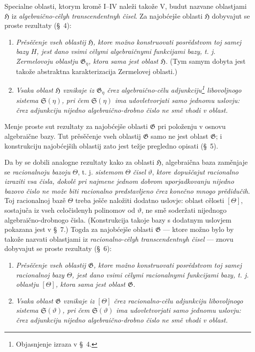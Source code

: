 \documentclass[11pt]{article}
\begin{document}
Specialne oblasti, ktorym kromě I--IV naleži takože V, budut nazvane oblastjami $\mathfrak H$ iz {\itshape algebraično-cělyh transcendentnyh čisel}. Za najobćejše oblasti $\mathfrak H$ dobyvajut se proste rezultaty (\S\ 4):
\begin{enumerate}
\item[a)] {\itshape Prěsěčenje vseh oblastij $\mathfrak H$, ktore možno konstruovati posrědstvom toj samej bazy $H$, jest dano vsimi cělymi algebraičnymi funkcijami bazy, t. j. Zermelovoju oblastju $\mathfrak G_\eta$, ktora sama jest oblast $\mathfrak H$.} (Tym samym dobyta jest takože abstraktna karakterizacija Zermelovej oblasti.)
\item[b)] {\itshape Vsaka oblast $\mathfrak H$ vznikaje iz $\mathfrak G_\eta$ črez algebraično-cělu adjunkciju\footnote{Objasnjenje izraza v \S\ 4.} libovoljnogo sistema $\mathfrak S(\eta)$, pri čem $\mathfrak S(\eta)$ ima udovletvorjati samo jednomu uslovju: črez adjunkciju nijedno algebraično-drobno čislo ne smě vhodi v oblast.}
\end{enumerate}

Menje proste sut rezultaty za najobćejše oblasti $\mathfrak G$ pri položenju v osnovu algebraične bazy. Tut prěsěčenje vseh oblastij $\mathfrak G$ samo ne jest oblast $\mathfrak G$; i konstrukciju najobćejših oblastij zato jest težje pregledno opisati (\S\ 5).

Da by se dobili analogne rezultaty kako za oblasti $\mathfrak H$, algebraična baza zaměnjaje se {\itshape racionalnoju bazoju} $\Theta$, t. j. {\itshape sistemom} $\Theta$ {\itshape čisel} $\vartheta$, {\itshape ktore dopuščajut racionalno izraziti vsa čisla, dokolě pri najmene jednom dobrom uporjadkovanju nijedno bazovo čislo ne može biti racionalno predstavljeno črez konečno mnogo prědidučih}. Toj racionalnoj bazě $\Theta$ treba ješče naložiti dodatno uslovje: oblast cělosti $[\Theta]$, sostajuča iz vseh celočislenyh polinomov od $\vartheta$, ne smě soderžati nijednogo algebraično-drobnogo čisla. (Konstrukcija takoje bazy s dodatnym uslovjem pokazana jest v \S\ 7.) Togda za najobćejše oblasti $\mathfrak G$ --- ktore možno bylo by takože nazvati oblastjami iz {\itshape racionalno-cělyh transcendentnyh čisel} --- znovu dobyvajut se proste rezultaty (\S\ 6):
\begin{enumerate}
\item[a)] {\itshape Prěsěčenje vseh oblastij $\mathfrak G$, ktore možno konstruovati posrědstvom toj samej racionalnoj bazy $\Theta$, jest dano vsimi cělymi racionalnymi funkcijami bazy, t. j. oblastju $[\Theta]$, ktora sama jest oblast $\mathfrak G$.}
\item[b)] {\itshape Vsaka oblast $\mathfrak G$ vznikaje iz $[\Theta]$ črez racionalno-cělu adjunkciju libovoljnogo sistema $\mathfrak S(\vartheta)$, pri čem $\mathfrak S(\vartheta)$ ima udovletvorjati samo jednomu uslovju: črez adjunkciju nijedno algebraično-drobno čislo ne smě vhodi v oblast.}
\end{enumerate}
\end{document}
